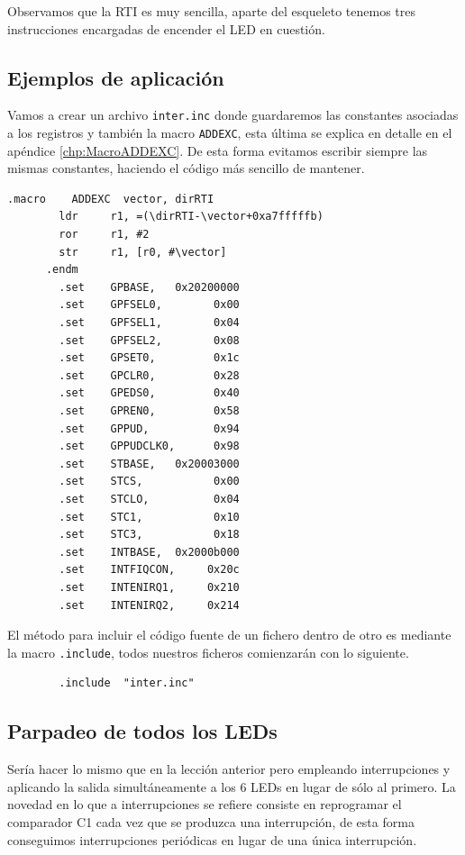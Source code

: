 Observamos que la RTI es muy sencilla, aparte del esqueleto tenemos tres instrucciones
encargadas de encender el LED en cuestión.

\subsection{Ejemplos de aplicación}

Vamos a crear un archivo {\tt inter.inc} donde guardaremos las constantes
asociadas a los registros y también la macro {\tt ADDEXC}, esta última
se explica en detalle en el apéndice \ref{chp:MacroADDEXC}. De esta forma evitamos escribir
siempre las mismas constantes, haciendo el código más sencillo de mantener.

\begin{lstlisting}[caption={inter.inc},label={lst:codigoPract5_0}]
      .macro    ADDEXC  vector, dirRTI
        ldr     r1, =(\dirRTI-\vector+0xa7fffffb)
        ror     r1, #2
        str     r1, [r0, #\vector]
      .endm
        .set    GPBASE,   0x20200000
        .set    GPFSEL0,        0x00
        .set    GPFSEL1,        0x04
        .set    GPFSEL2,        0x08
        .set    GPSET0,         0x1c
        .set    GPCLR0,         0x28
        .set    GPEDS0,         0x40
        .set    GPREN0,         0x58
        .set    GPPUD,          0x94
        .set    GPPUDCLK0,      0x98
        .set    STBASE,   0x20003000
        .set    STCS,           0x00
        .set    STCLO,          0x04
        .set    STC1,           0x10
        .set    STC3,           0x18
        .set    INTBASE,  0x2000b000
        .set    INTFIQCON,     0x20c
        .set    INTENIRQ1,     0x210
        .set    INTENIRQ2,     0x214
\end{lstlisting}

El método para incluir el código fuente de un fichero dentro de otro es mediante
la macro {\tt .include}, todos nuestros ficheros comienzarán con lo siguiente.

\begin{lstlisting}
        .include  "inter.inc"
\end{lstlisting}

\subsection{Parpadeo de todos los LEDs}

Sería hacer lo mismo que en la lección anterior pero empleando interrupciones y aplicando
la salida simultáneamente a los 6 LEDs en lugar de sólo al primero. La novedad en lo
que a interrupciones se refiere consiste en reprogramar el comparador C1 cada vez que
se produzca una interrupción, de esta forma conseguimos interrupciones periódicas en lugar
de una única interrupción.

